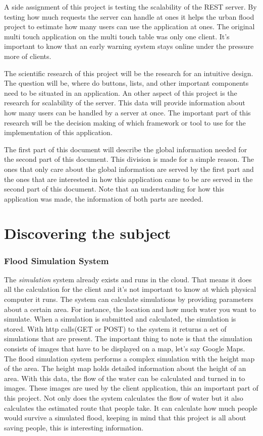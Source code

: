 A side assignment of this project is testing the scalability of the REST server. By testing how much requests the server can handle at ones it helps the urban flood project to estimate how many users can use the application at ones. The original multi touch application on the multi touch table was only one client. It's important to know that an early warning system stays online under the pressure more of clients.

The scientific research of this project will be the research for an intuitive design. The question will be, where do buttons, lists, and other important components need to be situated in an application. An other aspect of this project is the research for scalability of the server. This data will provide information about how many users can be handled by a server at once. The important part of this research will be the decision making of which framework or tool to use for the implementation of this application.

The first part of this document will describe the global information needed for the second part of this document. This division is made for  a simple reason. The ones that only care about the global information are served by the first part and the ones that are interested in how this application came to be are served in the second part of this document. Note that an understanding for how this application was made, the information of both parts are needed.

\part{Discovering the subject}
\section{Flood Simulation System}
The \emph{simulation} system already exists and runs in the cloud. That means it does all the calculation for the client and it's not important to know at which physical computer it runs. The system can calculate simulations by providing parameters about a certain area. For instance, the location and how much water you want to simulate. When a simulation is submitted and calculated, the simulation is stored. With http calls(GET or POST) to the system it returns a set of simulations that are present. The important thing to note is that the simulation consists of images that have to be displayed on a map, let's say Google Maps. The flood simulation system performs a complex simulation with the height map of the area. The height map holds detailed information about the height of an area. With this data, the flow of the water can be calculated and turned in to images. These images are used by the client application, this an important part of this project.
Not only does the system calculates the flow of water but it also calculates the estimated route that people take. It can calculate how much people would survive a simulated flood, keeping in mind that this project is all about saving people, this is interesting information.
 
